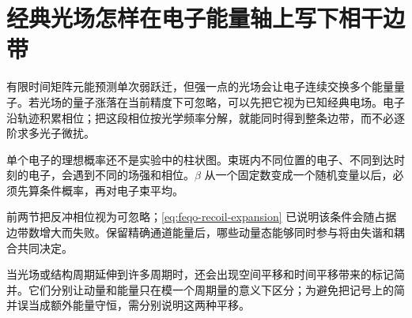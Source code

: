 \chapter{经典光场怎样在电子能量轴上写下相干边带}
\label{chap:feqo-classical-drive}

有限时间矩阵元能预测单次弱跃迁，但强一点的光场会让电子连续交换多个能量量子。若光场的量子涨落在当前精度下可忽略，可以先把它视为已知经典电场。电子沿轨迹积累相位；把这段相位按光学频率分解，就能同时得到整条边带，而不必逐阶求多光子微扰。



单个电子的理想概率还不是实验中的柱状图。束斑内不同位置的电子、不同到达时刻的电子，会遇到不同的场强和相位。\(\beta\) 从一个固定数变成一个随机变量以后，必须先算条件概率，再对电子束平均。



前两节把反冲相位视为可忽略；\cref{eq:feqo-recoil-expansion} 已说明该条件会随占据边带数增大而失败。保留精确通道能量后，哪些动量态能够同时参与将由失谐和耦合共同决定。



当光场或结构周期延伸到许多周期时，还会出现空间平移和时间平移带来的标记简并。它们分别让动量和能量只在模一个周期量的意义下区分；为避免把记号上的简并误当成额外能量守恒，需分别说明这两种平移。


